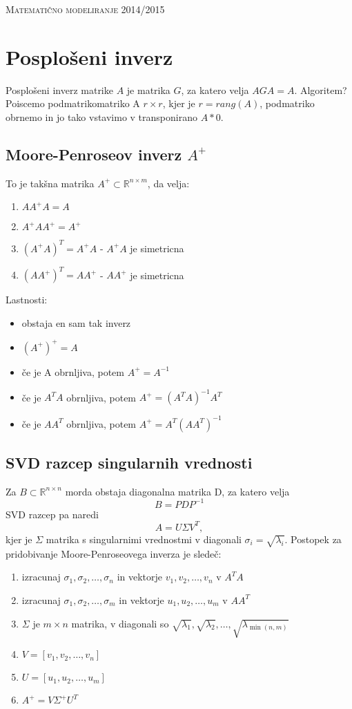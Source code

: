 \documentclass[a4paper,11pt]{article}
\begin{document}
\textsc{\Large Matematično modeliranje 2014/2015}\\[0.5cm]

\section{Posplošeni inverz}
Posplošeni inverz matrike \(A\) je matrika \(G\), za katero velja \(AGA=A\). Algoritem? Poiscemo podmatrikomatriko A \(r\times r\), kjer je \(r=rang(A)\), podmatriko obrnemo in jo tako vstavimo v transponirano \(A * 0\).

\subsection{Moore-Penroseov inverz \(A^+\)}
To je takšna matrika \(A^+ \subset \mathbb{R}^{n\times m}\), da velja:
\begin{enumerate}
	\item \(AA^+A = A\)
	\item \(A^+AA^+ = A^+\)
	\item \((A^+A)^T = A^+A\) - \(A^+A\) je simetricna
	\item \((AA^+)^T = AA^+\) - \(AA^+\) je simetricna
\end{enumerate}
Lastnosti:
\begin{itemize}
	\item obstaja en sam tak inverz
	\item \((A^+)^+ = A\)
	\item če je A obrnljiva, potem \(A^+ = A^{-1}\)
	\item če je \(A^TA\) obrnljiva, potem \(A^+ = (A^TA)^{-1}A^T\)
	\item če je \(AA^T\) obrnljiva, potem \(A^+ = A^T(AA^T)^{-1}\)
\end{itemize}

\subsection{SVD razcep singularnih vrednosti}
Za \(B \subset \mathbb{R}^{n\times n}\) morda obstaja diagonalna matrika D, za katero velja \[B = PDP^{-1}\]
SVD razcep pa naredi \[A = U\Sigma V^T,\]
kjer je \(\Sigma\) matrika s singularnimi vrednostmi v diagonali \(\sigma _i = \sqrt{\lambda _i}\).
Postopek za pridobivanje Moore-Penroseovega inverza je sledeč:
\begin{enumerate}
	\item izracunaj \(\sigma _1, \sigma _2, \ldots, \sigma _n\) in vektorje \(v_1, v_2, \ldots, v_n\) v \(A^TA\)
	\item izracunaj \(\sigma _1, \sigma _2, \ldots, \sigma _m\) in vektorje \(u_1, u_2, \ldots, u_m\) v \(AA^T\)
	\item \(\Sigma\) je \(m\times n\) matrika, v diagonali so \(\sqrt{\lambda _1}, \sqrt{\lambda _2}, \ldots, \sqrt{\lambda _{\min(n,m)}}\)
	\item \(V = [v_1, v_2, \ldots, v_n]\)
	\item \(U = [u_1, u_2, \ldots, u_m]\)
	\item \(A^+ = V\Sigma ^+U^T\)
\end{enumerate}
\end{document}
